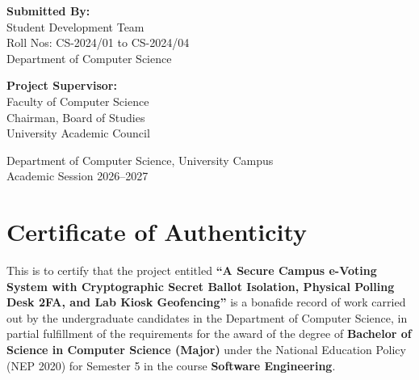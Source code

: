 \documentclass[12pt,a4paper,oneside]{report}
\begin{document}
\begin{titlepage}
    \begin{minipage}[t]{0.45\textwidth}
        \begin{flushleft} \large
            \textbf{Submitted By:}\\
            Student Development Team\\
            Roll Nos: CS-2024/01 to CS-2024/04\\
            Department of Computer Science
        \end{flushleft}
    \end{minipage}
    \hfill
    \begin{minipage}[t]{0.45\textwidth}
        \begin{flushright} \large
            \textbf{Project Supervisor:}\\
            Faculty of Computer Science\\
            Chairman, Board of Studies\\
            University Academic Council
        \end{flushright}
    \end{minipage}

    \vfill
    {\large Department of Computer Science, University Campus\\Academic Session 2026--2027 \par}
\end{titlepage}

\setcounter{page}{2}

\chapter*{Certificate of Authenticity}

This is to certify that the project entitled \textbf{``A Secure Campus e-Voting System with Cryptographic Secret Ballot Isolation, Physical Polling Desk 2FA, and Lab Kiosk Geofencing''} is a bonafide record of work carried out by the undergraduate candidates in the Department of Computer Science, in partial fulfillment of the requirements for the award of the degree of \textbf{Bachelor of Science in Computer Science (Major)} under the National Education Policy (NEP 2020) for Semester 5 in the course \textbf{Software Engineering}.
\end{document}
